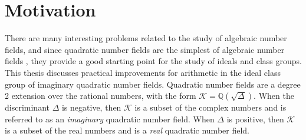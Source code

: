 \documentclass{ucalgthes1}
\theoremstyle{definition}
\newcommand{\QQ}{\mathbb{Q}}
\newcommand{\KK}{\mathcal{K}}
\begin{document}
\newpage
{}
{}



\begin{singlespace}
\newpage
{}
\tableofcontents
\pagestyle{plain}
\newpage
{}
\listoftables
\pagestyle{plain}
\newpage
{}
\listoffigures
\pagestyle{plain}
\newpage
{}
\listofalgorithms
\pagestyle{plain}
\clearpage
\clearpage          %
\end{singlespace}




\chapter{Motivation}

There are many interesting problems related to the study of algebraic number fields, and since quadratic number fields are the simplest of algebraic number fields \cite[p.77]{Jacobson2009}, they provide a good starting point for the study of ideals and class groups.  This thesis discusses practical improvements for arithmetic in the ideal class group of imaginary quadratic number fields.  Quadratic number fields are a degree 2 extension over the rational numbers, with the form $\KK = \QQ(\sqrt\Delta)$.  When the discriminant $\Delta$ is negative, then $\KK$ is a subset of the complex numbers and is referred to as an \emph{imaginary} quadratic number field.  When $\Delta$ is positive, then $\KK$ is a subset of the real numbers and is a \emph{real} quadratic number field.
\end{document}
